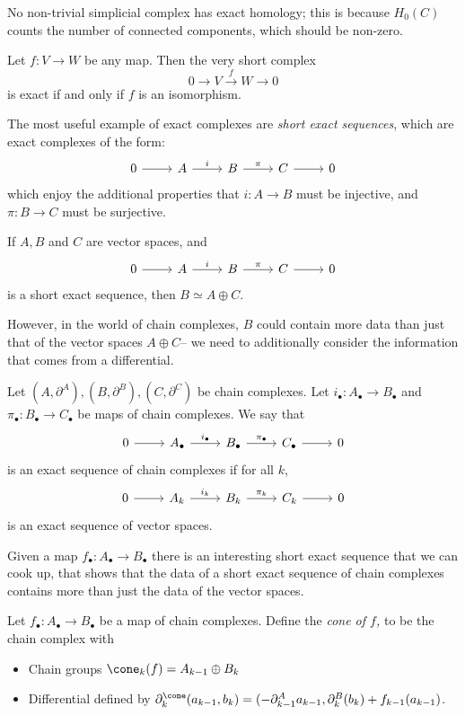 \begin{example}
No non-trivial  simplicial complex has exact homology; this is because $H_0(C)$ counts the number of connected components, which should be non-zero. 
\end{example}
\begin{example} Let $f: V\to W$ be any map. Then the very short complex 
\[0 \to V\xrightarrow{f} W\to 0\]
is exact if and only if $f$ is an isomorphism. 
\end{example}
The most useful example of exact complexes are \emph{short exact sequences}, which are exact complexes of the form:
\[\begin{tikzcd} 0 \arrow{r} & A \arrow{r}{i} & B \arrow{r}{\pi} & C \arrow{r} & 0 \end{tikzcd}\]
which enjoy the additional properties that $i: A\to B$ must be injective, and $\pi: B\to C$ must be surjective.\\
\begin{claim}
If $A, B$ and $C$ are vector spaces, and \[\begin{tikzcd} 0 \arrow{r} & A \arrow{r}{i} & B \arrow{r}{\pi} & C \arrow{r} & 0 \end{tikzcd}\] is a short exact sequence, then $B\simeq A\oplus C$. 
\end{claim}
However, in the world of chain complexes, $B$ could contain more data than just that of the vector spaces $A\oplus C$-- we need to additionally consider the information that comes from a differential.
\begin{definition}
Let $(A, \partial^A), (B, \partial^B), (C, \partial^C)$ be chain complexes. Let $i_\bullet: A_\bullet\to B_\bullet$ and $\pi_\bullet: B_\bullet\to C_\bullet$ be maps of chain complexes. We say that 
\[\begin{tikzcd} 0 \arrow{r} & A_\bullet \arrow{r}{i_\bullet} & B_\bullet \arrow{r}{\pi_\bullet} & C_\bullet \arrow{r} & 0 \end{tikzcd}\] 
is an exact sequence of chain complexes if for all $k$, 
\[\begin{tikzcd} 0 \arrow{r} & A_k \arrow{r}{i_k} & B_k \arrow{r}{\pi_k} & C_k \arrow{r} & 0 \end{tikzcd}\] 
is an exact sequence of vector spaces. 
\end{definition}
Given a map $f_\bullet: A_\bullet\to B_\bullet$ there is an interesting short exact sequence that we can cook up, that shows that the data of a short exact sequence of chain complexes contains more than just the data of the vector spaces.  
\begin{definition}
Let $f_\bullet:A_\bullet\to B_\bullet$ be a map of chain complexes. Define the \emph{cone of $f$,} to be the chain complex with 
\begin{itemize}
\item Chain groups $\cone_{k}(f)=A_{k-1}\oplus B_k$
\item Differential defined by $\partial_k^{\cone}(a_{k-1}, b_k)= (-  \partial_{k-1}^A a_{k-1}, \partial^B_k(b_k)+f_{k-1}(a_{k-1})$. 
\end{itemize}
\label{def:chaincone}
\end{definition}
